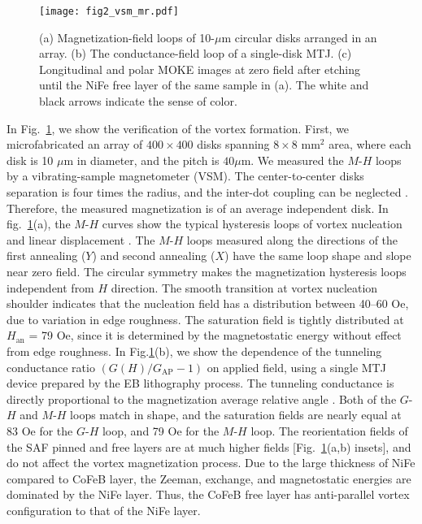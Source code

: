 \documentclass[10pt]{iopart}
\begin{document}
    \begin{figure}
    \texttt{[image: fig2\_vsm\_mr.pdf]}
    \caption{(a) Magnetization-field loops of 10-$\mu$m circular disks arranged in an array. (b) The conductance-field loop of a single-disk MTJ. (c) Longitudinal and polar MOKE images {at zero field after etching until the} NiFe free layer of the same sample in (a). The white and black arrows indicate the sense of color.}
    \label{fig:vsm_mr}
    \end{figure}
    
    
    In Fig.~\ref{fig:vsm_mr}, we show the verification of the vortex formation. First, we microfabricated {an array of $400 \times 400$ disks spanning $8 \times 8$ mm$^2$ area, where each disk is 10 $\mu$m in diameter, and the pitch is $40\mu$m.} We measured the $M$-$H$ loops by a vibrating-sample magnetometer (VSM). The center-to-center disks separation is four times the radius, and the inter-dot coupling can be neglected \cite{mejia-lopez_2006,vogel_2010}. {Therefore, the measured magnetization is of an average independent disk. In fig.~\ref{fig:vsm_mr}(a),} the $M$-$H$ curves show the typical hysteresis loops of vortex nucleation and linear displacement \cite{guslienko_2002}. The $M$-$H$ loops measured along the directions of the first annealing ($Y$) and second annealing ($X$) have the same loop shape and slope near zero field. The circular symmetry makes the magnetization hysteresis loops independent from $H$ direction.
    {The smooth transition at vortex nucleation shoulder indicates that the nucleation field has a distribution between 40--60 Oe, due to variation in edge roughness. The saturation field is tightly distributed at $H_\mathrm{an}$ = 79 Oe, since it is determined by the magnetostatic energy without effect from edge roughness.}
    In Fig.\ref{fig:vsm_mr}(b), we show the dependence of the tunneling conductance ratio $\left(G(H)/G_\mathrm{AP} - 1 \right)$ on applied field, using a single MTJ device prepared by the EB lithography process. The tunneling conductance is directly proportional to the magnetization average relative angle \cite{slonczewski_1989,nakano_2017,nakano_2018,ogasawara_2019a}. Both of the $G$-$H$ and $M$-$H$ loops match in shape, and the saturation fields are nearly equal at 83 Oe for the $G$-$H$ loop, and 79 Oe for the $M$-$H$ loop.
    The reorientation fields of the SAF pinned and free layers are at much higher fields [Fig.~\ref{fig:vsm_mr}(a,b) insets], and do not affect the vortex magnetization process. Due to the large thickness of NiFe compared to CoFeB layer, the Zeeman, exchange, and magnetostatic energies are dominated by the NiFe layer. Thus, the CoFeB free layer has anti-parallel vortex configuration to that of the NiFe layer. 
\end{document}
